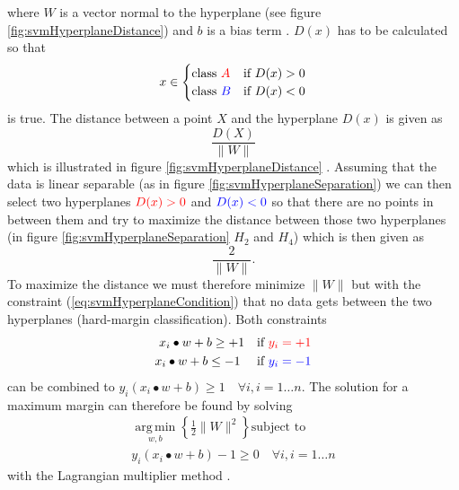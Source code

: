 where $W$ is a vector normal to the hyperplane (see figure \ref{fig:svmHyperplaneDistance}) and $b$ is a bias term \cite{Boser1992}. $D(x)$ has to be calculated so that
\begin{equation}
	x \in 
	\begin{cases}
	\text{class } {\color{red}A} & \text{if } D(x) > 0 \\
	\text{class } {\color{blue}B} & \text{if } D(x) < 0
	\end{cases}	
\end{equation}
is true. The distance between a point $X$ and the hyperplane $D(x)$ is given as
\begin{equation}
\frac{D(X)}{\|W\|}
\end{equation}
which is illustrated in figure \ref{fig:svmHyperplaneDistance} \cite{Thome2012}. Assuming that the data is linear separable {(as in figure \ref{fig:svmHyperplaneSeparation})} we can then select two hyperplanes ${\color{red}D(x)>0}$ and ${\color{blue}D(x)<0}$ so that there are no points in between them and try to maximize the distance between those two hyperplanes {(in figure \ref{fig:svmHyperplaneSeparation} $H_2$ and $H_4$)} which is then given as 
\begin{equation}
\frac{2}{\|W\|}.
\end{equation}
To maximize the distance we must therefore minimize $\|W\|$ but with the constraint {(\ref{eq:svmHyperplaneCondition})} that no data gets between the two hyperplanes {(hard-margin classification)}. Both constraints
\begin{equation}
	\begin{split}
	x_i \bullet w+b \geq +1 \quad \text{if } {\color{red}y_i=+1}\\
	x_i \bullet w+b \leq -1 \quad \text{ if } {\color{blue}y_i=-1}
	\end{split}
\label{eq:svmHyperplaneCondition}
\end{equation}
can be combined to $y_i(x_i\bullet w + b)\geq 1\quad \forall i, i=1\dots n$. The solution for a maximum margin can therefore be found by solving
\begin{equation}
\begin{split}
\operatorname*{arg\,min}_{w, b}	\left\{\frac{1}{2}\|W\|^2\right\} \text{subject to} \\
y_i(x_i\bullet w + b)-1\geq 0 \quad \forall i, i=1\dots n	
\end{split}
\end{equation}
with the Lagrangian multiplier method \cite{Thome2012}. 

